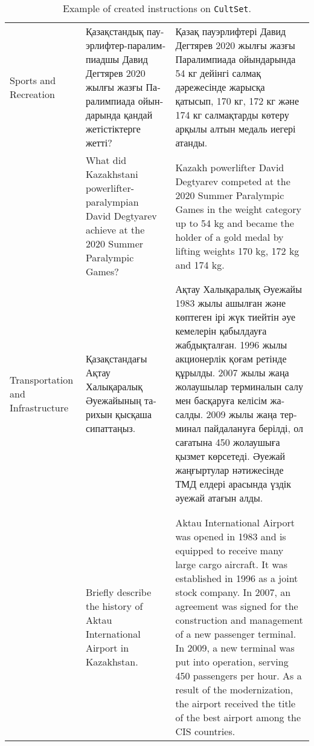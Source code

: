 \begin{table*}[b!]
{\begin{tabular}{p{}p{}p{}}
\midrule
Sports and Recreation & \foreignlanguage{russian}{Қазақстандық пауэрлифтер-паралимпиадшы Давид Дегтярев 2020 жылғы жазғы Паралимпиада ойындарында қандай жетістіктерге жетті?} & \foreignlanguage{russian}{Қазақ пауэрлифтері Давид Дегтярев 2020 жылғы жазғы Паралимпиада ойындарында 54 кг дейінгі салмақ дәрежесінде жарысқа қатысып, 170 кг, 172 кг және 174 кг салмақтарды көтеру арқылы алтын медаль иегері атанды.} \\
 & What did Kazakhstani powerlifter-paralympian David Degtyarev achieve at the 2020 Summer Paralympic Games? & Kazakh powerlifter David Degtyarev competed at the 2020 Summer Paralympic Games in the weight category up to 54 kg and became the holder of a gold medal by lifting weights 170 kg, 172 kg and 174 kg.  \\ 
\midrule
Transportation and Infrastructure & \foreignlanguage{russian}{Қазақстандағы Ақтау Халықаралық Әуежайының тарихын қысқаша сипаттаңыз.} & \foreignlanguage{russian}{Ақтау Халықаралық Әуежайы 1983 жылы ашылған және көптеген ірі жүк тиейтін әуе кемелерін қабылдауға жабдықталған. 1996 жылы акционерлік қоғам ретінде құрылды. 2007 жылы жаңа жолаушылар терминалын салу мен басқаруға келісім жасалды. 2009 жылы жаңа терминал пайдалануға берілді, ол сағатына 450 жолаушыға қызмет көрсетеді. Әуежай жаңғыртулар нәтижесінде ТМД елдері арасында үздік әуежай атағын алды.} \\
\\ \\ & Briefly describe the history of Aktau International Airport in Kazakhstan. & Aktau International Airport was opened in 1983 and is equipped to receive many large cargo aircraft. It was established in 1996 as a joint stock company. In 2007, an agreement was signed for the construction and management of a new passenger terminal. In 2009, a new terminal was put into operation, serving 450 passengers per hour. As a result of the modernization, the airport received the title of the best airport among the CIS countries.  \\ 

\bottomrule
\end{tabular} }
\caption{Example of created instructions on \texttt{CultSet}.}
\end{table*}